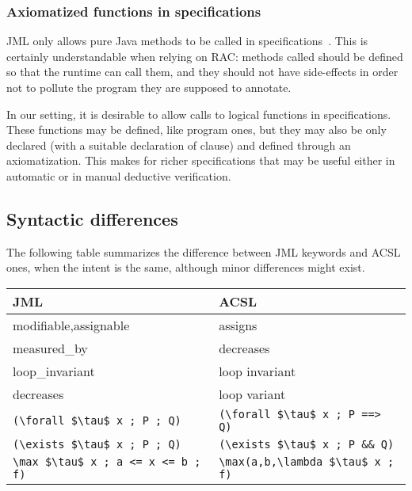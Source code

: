 \subsubsection*{Axiomatized functions in specifications}

JML only allows pure Java methods to be called in
specifications~\cite{leavens00preliminary}. This is certainly
understandable when relying on RAC: methods called should be defined
so that the runtime can call them, and they should not have
side-effects in order not to pollute the program they are supposed to
annotate.

In our setting, it is desirable to allow calls to logical functions in
specifications. These functions may be defined, like program ones, but
they may also be only declared (with a suitable declaration of \reads
clause) and defined through an axiomatization.
This makes for richer specifications that may be useful either in
automatic or in manual deductive verification.

\subsection{Syntactic differences}

The following table summarizes the difference between JML keywords and
ACSL ones, when the intent is the same, although minor differences
might exist.
\begin{center}
\begin{tabular}{|l|l|}
\hline
  JML                  & ACSL \\ \hline
  modifiable,assignable           & assigns \\
  measured\_by         & decreases \\
  loop\_invariant      & loop invariant \\
  decreases            & loop variant \\
  \lstinline|(\forall $\tau$ x ; P ; Q)| &
       \lstinline|(\forall $\tau$ x ; P ==> Q)| \\
  \lstinline|(\exists $\tau$ x ; P ; Q)| &
        \lstinline|(\exists $\tau$ x ; P && Q)| \\
  \lstinline|\max $\tau$ x ; a <= x <= b ; f)| &
        \lstinline|\max(a,b,\lambda $\tau$ x ; f)| \\
  \hline
\end{tabular}
\end{center}



